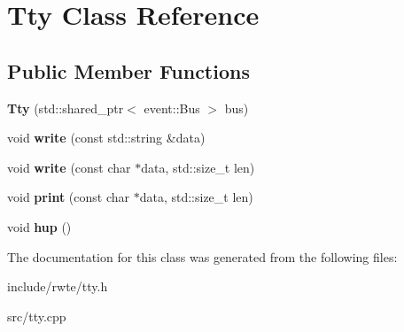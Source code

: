 \hypertarget{classTty}{}\section{Tty Class Reference}
\label{classTty}
\subsection*{Public Member Functions}
\begin{DoxyCompactItemize}
\item 
\mbox{\label{classTty_ad626bb05646908c2977f05cf96e4b247}} 
{\bfseries Tty} (std\+::shared\+\_\+ptr$<$ event\+::\+Bus $>$ bus)
\item 
\mbox{\label{classTty_a1d604b5171d9c00425ef3ebe6087d95b}} 
void {\bfseries write} (const std\+::string \&data)
\item 
\mbox{\label{classTty_a018589ed97a33139c2b61837e3d56682}} 
void {\bfseries write} (const char $\ast$data, std\+::size\+\_\+t len)
\item 
\mbox{\label{classTty_aa79101d583e85a969197e1ee486ff503}} 
void {\bfseries print} (const char $\ast$data, std\+::size\+\_\+t len)
\item 
\mbox{\label{classTty_af6b78a29f28157d90950fa631a310f70}} 
void {\bfseries hup} ()
\end{DoxyCompactItemize}


The documentation for this class was generated from the following files\+:\begin{DoxyCompactItemize}
\item 
include/rwte/tty.\+h\item 
src/tty.\+cpp\end{DoxyCompactItemize}
